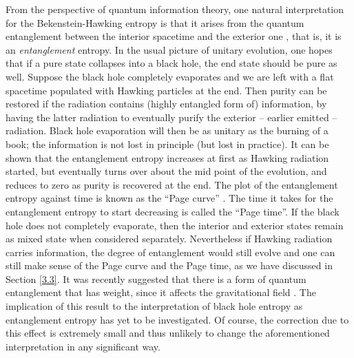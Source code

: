\documentclass[12pt]{article}
\newcommand{\2}{$^2$}
\newcommand{\3}{$^3$}
\newcommand{\4}{$_4$}
\newcommand{\5}{$_5$}
\begin{document}
From the perspective of quantum information theory, one natural interpretation for the Bekenstein-Hawking entropy is that it arises from the quantum entanglement between the interior spacetime and the exterior one \cite{9404039}, that is, it is an \emph{entanglement} entropy. In the usual picture of unitary evolution, one hopes that if a pure state collapses into a black hole, the end state should be pure as well. 
Suppose the black hole completely evaporates and we are left with a flat spacetime populated with Hawking particles at the end. Then purity can be restored if the radiation contains (highly entangled form of) information, by having the latter radiation to eventually purify the exterior -- earlier emitted -- radiation. Black hole evaporation will then be as unitary as the burning of a book; the information is not lost in principle (but lost in practice). It can be shown that the entanglement entropy increases at first as Hawking radiation started, but eventually turns over about the mid point of the evolution, and reduces to zero as purity is recovered at the end. The plot of the entanglement entropy against time is known as the ``Page curve'' \cite{page1, page2}. The time it takes for the entanglement entropy to start decreasing is called the ``Page time''. If the black hole does not completely evaporate, then the interior and exterior states remain as mixed state when considered separately. Nevertheless if Hawking radiation carries information, the degree of entanglement would still evolve and one can still make sense of the Page curve and the Page time, as we have discussed in Section \ref{3.3}. It was recently suggested that there is a form of quantum entanglement that has weight, since it affects the gravitational field \cite{DEB}. The implication of this result to the interpretation of black hole entropy as entanglement entropy has yet to be investigated. Of course, the correction due to this effect is extremely small and thus unlikely to change the aforementioned interpretation in any significant way. 
\end{document}
